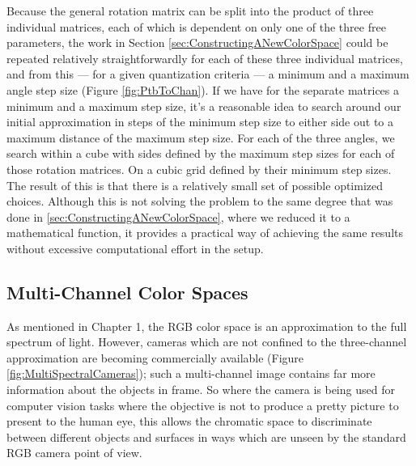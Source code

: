 Because the general rotation matrix can be split into the product of three individual matrices, each of which is dependent on only one of the three free parameters, the work in Section \ref{sec:ConstructingANewColorSpace} could be repeated relatively straightforwardly for each of these three individual matrices, and from this --- for a given quantization criteria --- a minimum and a maximum angle step size (Figure \ref{fig:PtbToChan}). If we have for the separate matrices a minimum and a maximum step size, it's a reasonable idea to search around our initial approximation in steps of the minimum step size to either side out to a maximum distance of the maximum step size. For each of the three angles, we search within a cube with sides defined by the maximum step sizes for each of those rotation matrices. On a cubic grid defined by their minimum step sizes. The result of this is that there is a relatively small set of possible optimized choices. Although this is not solving the problem to the same degree that was done in \ref{sec:ConstructingANewColorSpace}, where we reduced it to a mathematical function, it provides a practical way of achieving the same results without excessive computational effort in the setup. 

\subsection{Multi-Channel Color Spaces}\label{sec:MultiChannelColorSpaces}

As mentioned in Chapter 1, the RGB color space is an approximation to the full spectrum of light. However, cameras which are not confined to the three-channel approximation are becoming commercially available (Figure \ref{fig:MultiSpectralCameras}); such a multi-channel image contains far more information about the objects in frame. So where the camera is being used for computer vision tasks where the objective is not to produce a pretty picture to present to the human eye, this allows the chromatic space to discriminate between different objects and surfaces in ways which are unseen by the standard RGB camera point of view.


